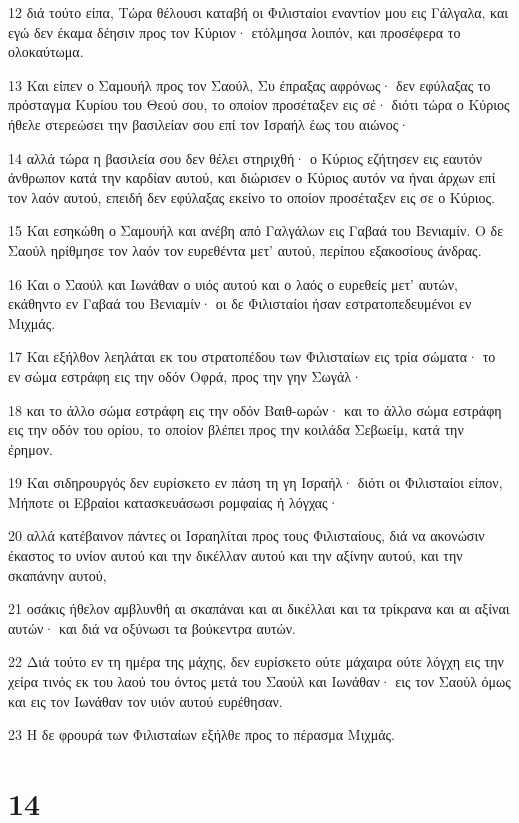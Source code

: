 \par 12 διά τούτο είπα, Τώρα θέλουσι καταβή οι Φιλισταίοι εναντίον μου εις Γάλγαλα, και εγώ δεν έκαμα δέησιν προς τον Κύριον· ετόλμησα λοιπόν, και προσέφερα το ολοκαύτωμα.
\par 13 Και είπεν ο Σαμουήλ προς τον Σαούλ, Συ έπραξας αφρόνως· δεν εφύλαξας το πρόσταγμα Κυρίου του Θεού σου, το οποίον προσέταξεν εις σέ· διότι τώρα ο Κύριος ήθελε στερεώσει την βασιλείαν σου επί τον Ισραήλ έως του αιώνος·
\par 14 αλλά τώρα η βασιλεία σου δεν θέλει στηριχθή· ο Κύριος εζήτησεν εις εαυτόν άνθρωπον κατά την καρδίαν αυτού, και διώρισεν ο Κύριος αυτόν να ήναι άρχων επί τον λαόν αυτού, επειδή δεν εφύλαξας εκείνο το οποίον προσέταξεν εις σε ο Κύριος.
\par 15 Και εσηκώθη ο Σαμουήλ και ανέβη από Γαλγάλων εις Γαβαά του Βενιαμίν. Ο δε Σαούλ ηρίθμησε τον λαόν τον ευρεθέντα μετ' αυτού, περίπου εξακοσίους άνδρας.
\par 16 Και ο Σαούλ και Ιωνάθαν ο υιός αυτού και ο λαός ο ευρεθείς μετ' αυτών, εκάθηντο εν Γαβαά του Βενιαμίν· οι δε Φιλισταίοι ήσαν εστρατοπεδευμένοι εν Μιχμάς.
\par 17 Και εξήλθον λεηλάται εκ του στρατοπέδου των Φιλισταίων εις τρία σώματα· το εν σώμα εστράφη εις την οδόν Οφρά, προς την γην Σωγάλ·
\par 18 και το άλλο σώμα εστράφη εις την οδόν Βαιθ-ωρών· και το άλλο σώμα εστράφη εις την οδόν του ορίου, το οποίον βλέπει προς την κοιλάδα Σεβωείμ, κατά την έρημον.
\par 19 Και σιδηρουργός δεν ευρίσκετο εν πάση τη γη Ισραήλ· διότι οι Φιλισταίοι είπον, Μήποτε οι Εβραίοι κατασκευάσωσι ρομφαίας ή λόγχας·
\par 20 αλλά κατέβαινον πάντες οι Ισραηλίται προς τους Φιλισταίους, διά να ακονώσιν έκαστος το υνίον αυτού και την δικέλλαν αυτού και την αξίνην αυτού, και την σκαπάνην αυτού,
\par 21 οσάκις ήθελον αμβλυνθή αι σκαπάναι και αι δικέλλαι και τα τρίκρανα και αι αξίναι αυτών· και διά να οξύνωσι τα βούκεντρα αυτών.
\par 22 Διά τούτο εν τη ημέρα της μάχης, δεν ευρίσκετο ούτε μάχαιρα ούτε λόγχη εις την χείρα τινός εκ του λαού του όντος μετά του Σαούλ και Ιωνάθαν· εις τον Σαούλ όμως και εις τον Ιωνάθαν τον υιόν αυτού ευρέθησαν.
\par 23 Η δε φρουρά των Φιλισταίων εξήλθε προς το πέρασμα Μιχμάς.

\chapter{14}

